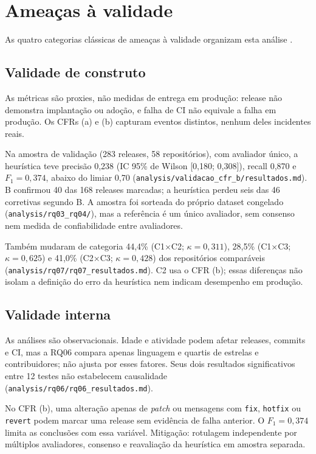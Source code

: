 \section{Ameaças à validade}
\label{sec:ameacas}

As quatro categorias clássicas de ameaças à validade organizam esta análise
\cite{wohlin}.

\subsection{Validade de construto}
\label{sec:ameacas-construto}

As métricas são proxies, não medidas de entrega em produção: release não
demonstra implantação ou adoção, e falha de CI não equivale a falha em
produção. Os CFRs (a) e (b) capturam eventos distintos, nenhum deles incidentes
reais.

Na amostra de validação (283 releases, 58 repositórios), com avaliador único,
a heurística teve precisão 0,238 (IC 95\% de Wilson [0,180; 0,308]), recall
0,870 e $F_1 = 0,374$, abaixo do limiar 0,70
(\texttt{analysis/validacao\_cfr\_b/resultados.md}). B confirmou 40 das 168
releases marcadas; a heurística perdeu seis das 46 corretivas segundo B. A
amostra foi sorteada do próprio dataset congelado (\texttt{analysis/rq03\_rq04/}),
mas a referência é um único avaliador, sem consenso nem medida de
confiabilidade entre avaliadores.

Também mudaram de categoria 44,4\% (C1$\times$C2; $\kappa = 0,311$), 28,5\%
(C1$\times$C3; $\kappa = 0,625$) e 41,0\% (C2$\times$C3; $\kappa = 0,428$)
dos repositórios comparáveis (\texttt{analysis/rq07/rq07\_resultados.md}).
C2 usa o CFR (b); essas diferenças não isolam a definição do erro da
heurística nem indicam desempenho em produção.

\subsection{Validade interna}
\label{sec:ameacas-interna}

As análises são observacionais. Idade e atividade podem afetar releases,
commits e CI, mas a RQ06 compara apenas linguagem e quartis de estrelas e
contribuidores; não ajusta por esses fatores. Seus dois resultados
significativos entre 12 testes não estabelecem causalidade
(\texttt{analysis/rq06/rq06\_resultados.md}).

No CFR (b), uma alteração apenas de \textit{patch} ou mensagens com
\texttt{fix}, \texttt{hotfix} ou \texttt{revert} podem marcar uma release sem
evidência de falha anterior. O $F_1 = 0,374$ limita as conclusões com essa
variável. Mitigação: rotulagem independente por múltiplos avaliadores,
consenso e reavaliação da heurística em amostra separada.

